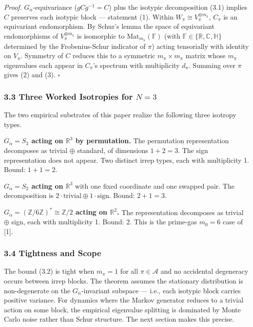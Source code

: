 \documentclass[
  11pt,
]{article}
\begin{document}
\emph{Proof.} \(G_\alpha\)-equivariance (\(gCg^{-1} = C\)) plus the
isotypic decomposition (3.1) implies \(C\) preserves each isotypic block
--- statement (1). Within \(W_\pi \cong V_\pi^{\oplus m_\pi}\),
\(C_\pi\) is an equivariant endomorphism. By Schur's lemma the space of
equivariant endomorphisms of \(V_\pi^{\oplus m_\pi}\) is isomorphic to
\(\mathrm{Mat}_{m_\pi}(\mathbb{F})\) (with
\(\mathbb{F} \in \{\mathbb{R}, \mathbb{C}, \mathbb{H}\}\) determined by
the Frobenius-Schur indicator of \(\pi\)) acting tensorially with
identity on \(V_\pi\). Symmetry of \(C\) reduces this to a symmetric
\(m_\pi \times m_\pi\) matrix whose \(m_\pi\) eigenvalues each appear in
\(C_\pi\)'s spectrum with multiplicity \(d_\pi\). Summing over \(\pi\)
gives (2) and (3). \(\square\)

\subsubsection{\texorpdfstring{3.3 Three Worked Isotropies for
\(N = 3\)}{3.3 Three Worked Isotropies for N = 3}}\label{three-worked-isotropies-for-n-3}

The two empirical substrates of this paper realize the following three
isotropy types.

\textbf{\(G_\alpha = S_3\) acting on \(\mathbb{R}^3\) by permutation.}
The permutation representation decomposes as trivial \(\oplus\)
standard, of dimensions \(1 + 2 = 3\). The sign representation does not
appear. Two distinct irrep types, each with multiplicity 1. Bound:
\(1 + 1 = 2\).

\textbf{\(G_\alpha = S_2\) acting on \(\mathbb{R}^3\)} with one fixed
coordinate and one swapped pair. The decomposition is
\(2 \cdot \text{trivial} \oplus 1 \cdot \text{sign}\). Bound:
\(2 + 1 = 3\).

\textbf{\(G_\alpha = (\mathbb{Z}/6\mathbb{Z})^* \cong \mathbb{Z}/2\)
acting on \(\mathbb{R}^2\).} The representation decomposes as trivial
\(\oplus\) sign, each with multiplicity 1. Bound: \(2\). This is the
prime-gas \(m_0 = 6\) case of {[}1{]}.

\subsubsection{3.4 Tightness and Scope}\label{tightness-and-scope}

The bound (3.2) is tight when \(m_\pi = 1\) for all
\(\pi \in \mathcal{A}\) and no accidental degeneracy occurs between
irrep blocks. The theorem assumes the stationary distribution is
non-degenerate on the \(G_\alpha\)-invariant subspace --- i.e., each
isotypic block carries positive variance. For dynamics where the Markov
generator reduces to a trivial action on some block, the empirical
eigenvalue splitting is dominated by Monte Carlo noise rather than Schur
structure. The next section makes this precise.
\end{document}
